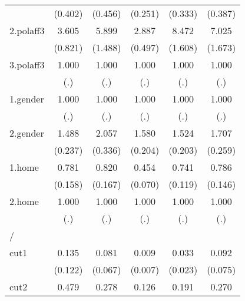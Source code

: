 \begin{table}[htbp]
\begin{tabular}{l*{5}{c}}
                &  (0.402)         &  (0.456)         &  (0.251)         &  (0.333)         &  (0.387)         \\
[1em]
2.polaff3       &    3.605\sym{***}&    5.899\sym{***}&    2.887\sym{***}&    8.472\sym{***}&    7.025\sym{***}\\
                &  (0.821)         &  (1.488)         &  (0.497)         &  (1.608)         &  (1.673)         \\
[1em]
3.polaff3       &    1.000         &    1.000         &    1.000         &    1.000         &    1.000         \\
                &      (.)         &      (.)         &      (.)         &      (.)         &      (.)         \\
[1em]
1.gender        &    1.000         &    1.000         &    1.000         &    1.000         &    1.000         \\
                &      (.)         &      (.)         &      (.)         &      (.)         &      (.)         \\
[1em]
2.gender        &    1.488\sym{**} &    2.057\sym{***}&    1.580\sym{***}&    1.524\sym{***}&    1.707\sym{***}\\
                &  (0.237)         &  (0.336)         &  (0.204)         &  (0.203)         &  (0.259)         \\
[1em]
1.home          &    0.781         &    0.820         &    0.454\sym{***}&    0.741\sym{*}  &    0.786         \\
                &  (0.158)         &  (0.167)         &  (0.070)         &  (0.119)         &  (0.146)         \\
[1em]
2.home          &    1.000         &    1.000         &    1.000         &    1.000         &    1.000         \\
                &      (.)         &      (.)         &      (.)         &      (.)         &      (.)         \\
\hline
/               &                  &                  &                  &                  &                  \\
cut1            &    0.135\sym{**} &    0.081\sym{***}&    0.009\sym{***}&    0.033\sym{***}&    0.092\sym{***}\\
                &  (0.122)         &  (0.067)         &  (0.007)         &  (0.023)         &  (0.075)         \\
[1em]
cut2            &    0.479         &    0.278         &    0.126\sym{***}&    0.191\sym{**} &    0.270         \\

\end{tabular}
\end{table}
